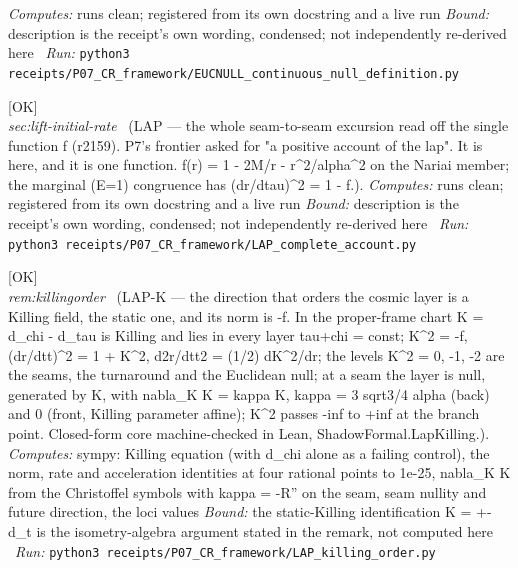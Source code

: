 \begin{description}
\emph{Computes:} runs clean; registered from its own docstring and a live run
 \emph{Bound:} description is the receipt's own wording, condensed; not independently re-derived here
\ \emph{Run:} \texttt{python3 receipts/P07\_CR\_framework/EUCNULL\_continuous\_null\_definition.py}
\item[\rcptlabel{LAP_complete_account}{P7R13}\textbf{P7R13}\quad\texttt{LAP\_complete\_account}]\hfill\textsf{[OK]}\\
\textit{sec:lift-initial-rate} \ (LAP --- the whole seam-to-seam excursion read off the single function f (r2159). P7's frontier asked for "a positive account of the lap". It is here, and it is one function. f(r) = 1 - 2M/r - r\textasciicircum{}2/alpha\textasciicircum{}2 on the Nariai member; the marginal (E=1) congruence has (dr/dtau)\textasciicircum{}2 = 1 - f.). 
\emph{Computes:} runs clean; registered from its own docstring and a live run
 \emph{Bound:} description is the receipt's own wording, condensed; not independently re-derived here
\ \emph{Run:} \texttt{python3 receipts/P07\_CR\_framework/LAP\_complete\_account.py}
\item[\rcptlabel{LAP_killing_order}{P7R14}\textbf{P7R14}\quad\texttt{LAP\_killing\_order}]\hfill\textsf{[OK]}\\
\textit{rem:killingorder} \ (LAP-K --- the direction that orders the cosmic layer is a Killing field, the static one, and its norm is -f. In the proper-frame chart K = d\_chi - d\_tau is Killing and lies in every layer tau+chi = const; \textbar{}K\textbar{}\textasciicircum{}2 = -f, (dr/dtt)\textasciicircum{}2 = 1 + \textbar{}K\textbar{}\textasciicircum{}2, d2r/dtt2 = (1/2) d\textbar{}K\textbar{}\textasciicircum{}2/dr; the levels \textbar{}K\textbar{}\textasciicircum{}2 = 0, -1, -2 are the seams, the turnaround and the Euclidean null; at a seam the layer is null, generated by K, with nabla\_K K = kappa K, kappa = 3 sqrt3/4 alpha (back) and 0 (front, Killing parameter affine); \textbar{}K\textbar{}\textasciicircum{}2 passes -inf to +inf at the branch point. Closed-form core machine-checked in Lean, ShadowFormal.LapKilling.). 
\emph{Computes:} sympy: Killing equation (with d\_chi alone as a failing control), the norm, rate and acceleration identities at four rational points to 1e-25, nabla\_K K from the Christoffel symbols with kappa = -R'' on the seam, seam nullity and future direction, the loci values
 \emph{Bound:} the static-Killing identification K = +-d\_t is the isometry-algebra argument stated in the remark, not computed here
\ \emph{Run:} \texttt{python3 receipts/P07\_CR\_framework/LAP\_killing\_order.py}

\end{description}
